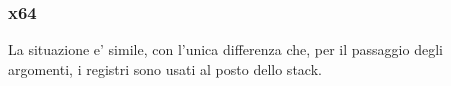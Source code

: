 \subsubsection{x64}

La situazione e' simile, con l'unica differenza che, per il passaggio degli argomenti, i registri sono usati al posto dello stack.







